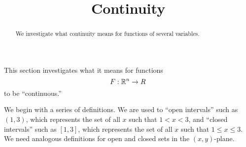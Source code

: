 \documentclass{ximera}
\title[Dig-In:]{Continuity}
\begin{document}
\begin{abstract}
We investigate what continuity means for functions of several variables.
\end{abstract}
\maketitle



This section investigates what it means for functions
\[
F:\mathbb R^n\to R
\]
to be ``continuous.''

We begin with a series of definitions. We are used to ``open
intervals'' such as $(1,3)$, which represents the set of all $x$ such
that $1<x<3$, and ``closed intervals'' such as $[1,3]$, which
represents the set of all $x$ such that $1\leq x\leq 3$. We need
analogous definitions for open and closed sets in the $(x,y)$-plane.






\end{document}
